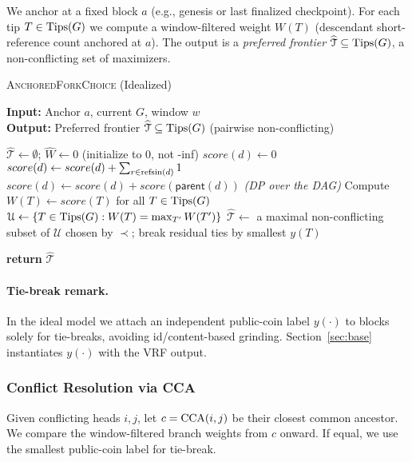 \fi

\medskip

We anchor at a fixed block $a$ (e.g., genesis or last finalized checkpoint). For each tip $T\in\mathrm{Tips}(G)$ we compute a window-filtered
weight $W(T)$ (descendant short-reference count anchored at $a$). The output is a \emph{preferred frontier} $\widehat{\mathcal T}\subseteq\mathrm{Tips}(G)$,
a non-conflicting set of maximizers. 

\begin{algorithm}[H]
\caption{\textsc{AnchoredForkChoice} (Idealized)}\label{alg:afc-ideal}
\label{alg:ideal-anchored-fc}

\textbf{Input:} Anchor $a$, current $G$, window $w$\\
\textbf{Output:} Preferred frontier $\widehat{\mathcal T}\subseteq\mathrm{Tips}(G)$ (pairwise non-conflicting) 
\begin{algorithmic}[1]
\State $\widehat{\mathcal T} \leftarrow \emptyset$; $\widehat{W} \leftarrow 0$ \hfill  (initialize to 0, not -inf)
  \State $score(d)\leftarrow 0$
\EndFor
{}
  \State $score(d) \gets score(d) + \sum_{r\in\mathrm{refsin}(d)} 1$
  \State $score(d) \gets score(d) + score(\textsf{parent}(d))$ \hfill \textit{(DP over the DAG)}
\EndFor
\State Compute $W(T)\gets score(T)$ for all $T\in\mathrm{Tips}(G)$
\State $\mathcal U \gets \{T\in\mathrm{Tips}(G): W(T)=\max_{T'} W(T')\}$
\State $\widehat{\mathcal T} \gets$ a maximal non-conflicting subset of $\mathcal U$ chosen by $\prec$; break residual ties by smallest $y(T)$ 

\State \textbf{return} $\widehat{\mathcal T}$
\end{algorithmic}
\end{algorithm}

\paragraph{Tie-break remark.} 
In the ideal model we attach an independent public-coin label $y(\cdot)$ to blocks solely for tie-breaks, avoiding id/content-based grinding.
Section~\ref{sec:base} instantiates $y(\cdot)$ with the VRF output.

\subsubsection{Conflict Resolution via CCA}
\label{subsec:alg5}
Given conflicting heads $i,j$, let $c=\mathrm{CCA}(i,j)$ be their closest common ancestor. We compare the window-filtered branch weights from $c$ onward.
If equal, we use the smallest public-coin label for tie-break. 


